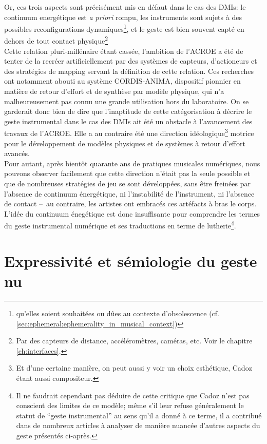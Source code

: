 \noindent Or, ces trois aspects sont précisément mis en défaut dans le cas des \glspl{DMI}: le continuum energétique est \textit{a priori} rompu, les instruments sont sujets à des possibles reconfigurations dynamiques\footnote{qu'elles soient souhaitées ou dûes au contexte d'obsolescence (cf. \ref{sec:ephemeral:ephemerality_in_musical_context})}, et le geste est bien souvent capté en dehors de tout contact physique\footnote{Par des capteurs de distance, accéléromètres, caméras, etc. Voir le chapitre \ref{ch:interfaces}.}\\
\indent Cette relation pluri-millénaire étant cassée, l'ambition de l'\gls{ACROE} a été de tenter de la recréer artificiellement par des systèmes de capteurs, d'actioneurs et des stratégies de mapping servant la définition de cette relation. Ces recherches ont notamment abouti au système \gls{CORDIS-ANIMA}, dispositif pionnier en matière de retour d'effort et de synthèse par modèle physique, qui n'a malheureusement pas connu une grande utilisation hors du laboratoire. On se garderait donc bien de dire que l'inaptitude de cette catégorisation à décrire le geste instrumental dans le cas des \glspl{DMI} ait été un obstacle à l'avancement des travaux de l'\gls{ACROE}. Elle a au contraire été une direction idéologique\footnote{Et d'une certaine manière, on peut aussi y voir un choix esthétique, Cadoz étant aussi compositeur.} motrice pour le développement de modèles physiques et de systèmes à retour d'effort avancés.\\
\indent Pour autant, après bientôt quarante ans de pratiques musicales numériques, nous pouvons observer facilement que cette direction n'était pas la seule possible et que de nombreuses stratégies de jeu se sont développées, sans être freinées par l'absence de continuum énergétique, ni l'instabilité de l'instrument, ni l'absence de contact --~au contraire, les artistes ont embracés ces artéfacts à bras le corps. L'idée du continuum énegétique est donc insuffisante pour comprendre les termes du geste instrumental numérique et ses traductions en terme de lutherie\footnote{Il ne faudrait cependant pas déduire de cette critique que Cadoz n'est pas conscient des limites de ce modèle; même s'il leur refuse généralement le statut de ``geste instrumental'' au sens qu'il a donné à ce terme, il a contribué dans de nombreux articles à analyser de manière nuancée d'autres aspects du geste présentés ci-après.}.


\section{Expressivité et sémiologie du geste nu}

